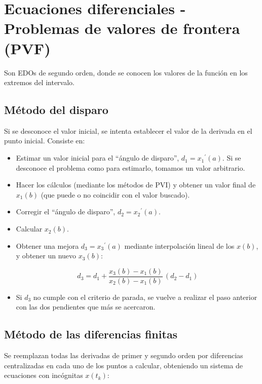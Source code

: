 \documentclass{article}
\begin{document}
\section{Ecuaciones diferenciales - Problemas de valores de frontera (PVF)}

Son EDOs de segundo orden, donde se conocen los valores de la función en los 
extremos del intervalo.

\subsection{Método del disparo}

Si se desconoce el valor inicial, se intenta establecer el valor de la derivada
en el punto inicial. Consiste en:

\begin{itemize}
    \item Estimar un valor inicial para el ``ángulo de disparo'', 
    $d_1 = {x_1}^\prime(a)$. Si se desconoce el problema como para estimarlo, 
    tomamos un valor arbitrario.

    \item Hacer los cálculos (mediante los métodos de PVI) y obtener un valor 
    final de ${x_1}(b)$ (que puede o no coincidir con el valor buscado).

    \item Corregir el ``ángulo de disparo'', $d_2 = {x_2}^\prime(a)$.

    \item Calcular ${x_2}(b)$.

    \item Obtener una mejora $d_3 = {x_3}^\prime(a)$ mediante interpolación 
    lineal de los $x(b)$, y obtener un nuevo ${x_3}(b)$:

    \[
        d_3 = d_1 + \frac{{x_3}(b) - {x_1}(b)}{{x_2}(b) - {x_1}(b)}\,(d_2 - d_1)
    \]

    \item Si $d_3$ no cumple con el criterio de parada, se vuelve a realizar el
    paso anterior con las dos pendientes que más se acercaron.
\end{itemize}

\subsection{Método de las diferencias finitas}

Se reemplazan todas las derivadas de primer y segundo orden por diferencias
centralizadas en cada uno de los puntos a calcular, obteniendo un sistema de 
ecuaciones con incógnitas $x(t_k)$:
\end{document}

